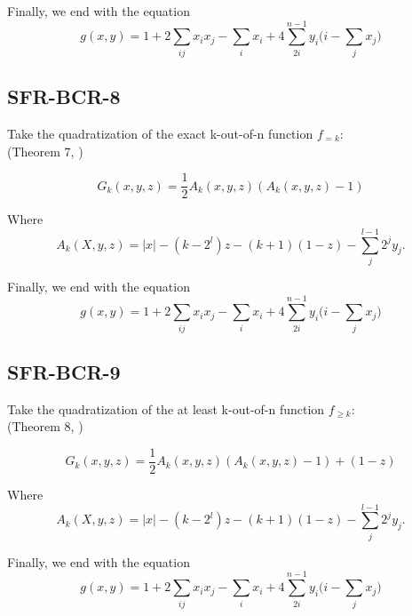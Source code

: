 \documentclass[a4paper,english,notitlepage,longbibliography,showpacs,preprintnumbers,amsmath,amssymb,aps,prx,nofootinbib,12pt,superscriptaddress]{revtex4-1}
\begin{document}
\noindent Finally, we end with the equation
\begin{equation}
  g(x,y) = 1 + 2\sum_{ij}x_ix_j - \sum_{i} x_i + 4\sum_{2i}^{n-1}y_i\Big(i - \sum_{j} x_j\Big)
\end{equation}



\subsection{SFR-BCR-8}

Take the quadratization of the exact k-out-of-n function $f_{=k}$:
\\(Theorem 7, \cite{Boros2018boundsPaper})

\begin{equation}
  G_k(x,y,z) = \frac{1}{2}A_k(x,y,z)(A_k(x,y,z)-1)
\end{equation}

\noindent Where
\begin{equation}
  A_k(X,y,z) = |x| - (k-2^l)z - (k+1)(1-z) - \sum_{j}^{l-1}2^jy_j.
\end{equation}


\noindent Finally, we end with the equation
\begin{equation}
  g(x,y) = 1 + 2\sum_{ij}x_ix_j - \sum_{i} x_i + 4\sum_{2i}^{n-1}y_i\Big(i - \sum_{j} x_j\Big)
\end{equation}

\subsection{SFR-BCR-9}

Take the quadratization of the at least k-out-of-n function $f_{\geq k}$:
\\(Theorem 8, \cite{Boros2018boundsPaper})

\begin{equation}
  G_k(x,y,z) = \frac{1}{2}A_k(x,y,z)(A_k(x,y,z)-1) + (1-z)
\end{equation}

\noindent Where
\begin{equation}
  A_k(X,y,z) = |x| - (k-2^l)z - (k+1)(1-z) - \sum_{j}^{l-1}2^jy_j.
\end{equation}

\noindent Finally, we end with the equation
\begin{equation}
  g(x,y) = 1 + 2\sum_{ij}x_ix_j - \sum_{i} x_i + 4\sum_{2i}^{n-1}y_i\Big(i - \sum_{j} x_j\Big)
\end{equation}


\end{document}
